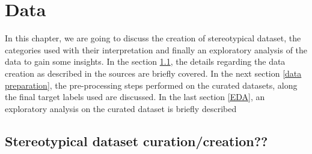 \chapter{Data}

In this chapter, we are going to discuss the creation of stereotypical dataset, the categories used with their interpretation and finally an exploratory analysis of the data to gain some insights. In the section \ref{stereotypical dataset}, the details regarding the data creation as described in the sources are briefly covered. In the next section \ref{data preparation}, the pre-processing steps performed on the curated datasets, along the final target labels used are discussed. In the last section \ref{EDA}, an exploratory analysis on the curated dataset is briefly described

\section{Stereotypical dataset curation/creation??}\label{stereotypical dataset}
